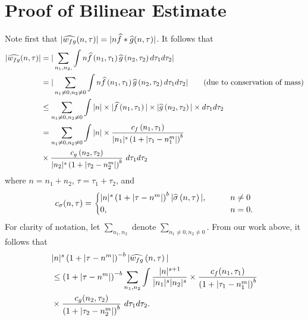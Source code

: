 \section{Proof of Bilinear Estimate}
Note first that $|\widehat{w_{fg}}(n, \tau) |  = | n\widehat{f} *  \widehat{g} 
(n, \tau)|$. It follows that
%
%
\begin{equation}
	\label{lnon-lin-rep}
	\begin{split}
		| \widehat{w_{fg}}(n, \tau)|
		& = | \sum_{n_1, n_2,}  \int n\widehat{f}\left( n_1,  \tau_1 
\right) \widehat{g}\left( n_2, \tau_2  
\right) d \tau_1 d \tau_2 |
\\
& = | \sum_{n_1 \neq 0, n_2 \neq 0}  \int n\widehat{f}\left( n_1,  \tau_1 
\right) \widehat{g}\left( n_2, \tau_2  
\right) d \tau_1 d \tau_2 | \qquad \text{(due to conservation of mass)}
\\
& \le \sum_{n_1 \neq 0, n_2 \neq 0}   \int | n | \times | \widehat{f}\left( n_1, \tau_1 
\right) | \times  | \widehat{g}\left( n_2, \tau_2 
\right) | \times  d \tau_1 d \tau_2  
\\
& = \sum_{n_1 \neq 0, n_2 \neq 0} \int | n | \times \frac{c_f\left( n_1, \tau_1 
\right)}{|n_1|^s \left( 1 + | \tau_1 - n_1^{m} | \right)^{b}}
\\
& \times \frac{c_{g}\left( n_2, \tau_2 \right)}{|n_2|^s\left( 1 + | \tau_2 -  n_2^{m }| 
\right)^{b}}
  \ d \tau_1 d \tau_2 
\end{split}
\end{equation}
%
%
where $n = n_1 + n_2$, $\tau = \tau_1 + \tau_2$, and 
%
%
\begin{equation*}
	\begin{split}
		c_\sigma(n, \tau) =
		\begin{cases}
			|n|^s \left( 1 + | \tau - n^{m } |  
		\right)^{b} | \widehat{\sigma}\left( n, \tau \right) |, \qquad & n \neq 0
		\\
		0, \qquad & n = 0.
	\end{cases}
	\end{split}
\end{equation*}
%
%
For clarity of notation, let  $\sum_{n_1, n_2}$ denote $\sum_{n_1 \neq 0, n_2
\neq 0}$. From our work above, it follows that 
%
%
\begin{equation}
	\label{lconvo-est-starting-pnt}
	\begin{split}
		 & |n|^s \left( 1 + | \tau - n^{m } | \right)^{-b} | \widehat{w_{fg}}\left( 
		n, \tau \right) |
		\\
		& \le \left( 1 + | \tau - n^{m } | \right)^{-b}
		\sum_{n_1, n_2} \int \frac{|n|^{s+1}}{|n_1|^s | n_2|^s} 
		\times \frac{c_f(n_1, \tau_1)}{\left( 1 + | \tau_1 - n_1^{m } | 
		\right)^{b}}
		\\
		& \times
		\frac{c_g(n_2, \tau_2)}{\left( 1 + | \tau_2 - n_2^{m } | 
		\right)^{b}}\ d \tau_1 d \tau_2.
	\end{split}
\end{equation}

